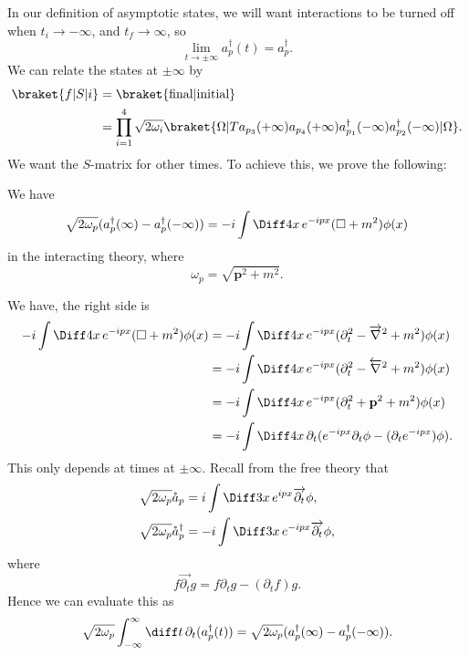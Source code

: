 \documentclass[12pt]{article}
\begin{document}
In our definition of asymptotic states, we will want interactions to be turned off when $t_i \to -\infty$, and $t_f \to \infty$, so
\[
\lim_{t \to \pm \infty} a_p^{\dagger} (t) = a_p^{\dagger}.
\]
We can relate the states at $\pm \infty$ by
\begin{align*}
	\braket{f|S|i} &= \braket{\text{final}|\text{initial}} \\
		       &= \prod_{i = 1}^4 \sqrt{2 \omega_i} \braket{\Omega | T a_{p_3}(+\infty) a_{p_4}(+\infty) a_{p_1}^{\dagger}(-\infty) a_{p_2}^{\dagger}(-\infty)| \Omega}.
\end{align*}
We want the $S$-matrix for other times. To achieve this, we prove the following:

\begin{proposition}
	We have
	\[
		\sqrt{2 \omega_p} (a_p^{\dagger}(\infty) - a_p^{\dagger}(-\infty)) = - i \int \Diff 4 x \, e^{-ipx} (\square + m^2) \phi(x)
	\]
	in the interacting theory, where
	\[
		\omega_p = \sqrt{\mathbf{p}^2 + m^2}.
	\]
\end{proposition}

\begin{proofbox}
	We have, the right side is
	\begin{align*}
		-i \int \Diff 4 x \, e^{-ipx}(\square + m^2)\phi(x) &= - i \int \Diff4 x \, e^{-ipx}(\partial_t^2 - \overrightarrow{\nabla}^2 + m^2) \phi(x) \\
								 &= - i \int \Diff 4 x \, e^{-ipx} (\partial_t^2 - \overleftarrow{\nabla}^2 + m^2) \phi(x) \\
								 &= - i \int \Diff 4 x \, e^{-ipx} (\partial_t^2 + \mathbf{p}^2 + m^2) \phi(x) \\
								 &= -i \int \Diff 4 x \, \partial_t(e^{-ipx} \partial_t \phi - (\partial_t e^{-ipx})\phi ).
	\end{align*}
	This only depends at times at $\pm \infty$. Recall from the free theory that
	\begin{align*}
		\sqrt{2 \omega_p} \mathring a_p &= i \int \Diff 3  x \, e^{ipx} \overrightarrow{\partial_t} \phi, \\
	\sqrt{2 \omega_p} \mathring{a}_p^{\dagger} &= -i \int \Diff 3 x \, e^{-ipx} \overrightarrow{\partial_t} \phi,
	\end{align*}
	where
	\[
		f \overrightarrow{\partial_t} g = f \partial_t g - (\partial_t f)g.
	\]
	Hence we can evaluate this as
	\[
		\sqrt{2 \omega_p} \int_{-\infty}^{\infty} \diff t \, \partial_t (a_p^{\dagger}(t)) = \sqrt{2\omega_p} (a_p^{\dagger}(\infty) - a_p^{\dagger}(-\infty)).
\]
\end{proofbox}
\end{document}
